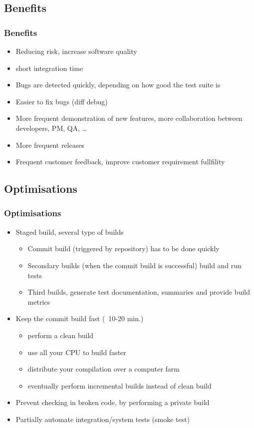 \documentclass{beamer}
\begin{document}
\subsection[Benefits]{Benefits}
\begin{frame}
\frametitle{Benefits}
\begin{itemize}
	\item<1-> Reducing risk, increase software quality 
    \item<2-> short integration time 
    \item<3-> Bugs are detected quickly, depending on how good the test suite
    is\cite{Duvall07}
    \item<4-> Easier to fix bugs (diff debug)
    \item<5-> More frequent demonstration of new features, more collaboration
    between developers, PM, QA, \ldots
    \item<6-> More frequent releases
    \item<7-> Frequent customer feedback, improve customer requirement
    fullfility
\end{itemize}
\end{frame}

\subsection[Optimisations]{Optimisations}

\begin{frame}
\frametitle{Optimisations}
\begin{itemize}
	\item<1-> Staged build, several type of builds\cite{Fowler06}
		\begin{itemize}
          \item<2-> Commit build (triggered by repository) has to be done
          quickly
          \item<3-> Secondary builds (when the commit build is successful) build
          and run tests
          \item<4-> Third builds, generate test documentation, summaries and
          provide build metrics\cite{Duvall07}
        \end{itemize}
    \item<5-> Keep the commit build fast\cite{Duvall07} (~10-20 min.)
    \begin{itemize}
      \item perform a clean build
      \item use all your CPU to build faster
      \item distribute your compilation over a computer farm\cite{Pool09}
      \item eventually perform incremental builds instead of clean build
    \end{itemize}
    \item<6-> Prevent checking in broken code, by performing a private
    build\cite{Duvall07}
    \item<7-> Partially automate integration/system tests (smoke
    test)\cite{Berczuk03}
\end{itemize}
\end{frame}
\end{document}
